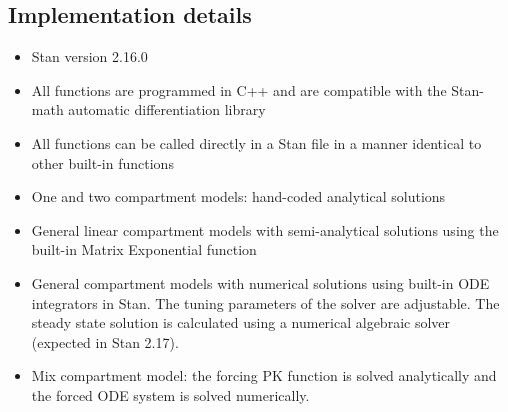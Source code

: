 \documentclass[11pt]{amsart}
\begin{document}
\subsection{Implementation details}
\begin{itemize}
  \item Stan version 2.16.0
  \item All functions are programmed in C++ and are compatible with the Stan-math automatic differentiation library \cite{AD}
  \item All functions can be called directly in a Stan file in a manner identical to other built-in functions
  \item One and two compartment models: hand-coded analytical solutions
  \item General linear compartment models with semi-analytical solutions using the built-in Matrix Exponential function
  \item General compartment models with numerical solutions using built-in ODE integrators in Stan. The tuning parameters of the solver are adjustable. The steady state solution is calculated using a numerical algebraic solver (expected in Stan 2.17).
  \item Mix compartment model: the forcing PK function is solved analytically and the forced ODE system is solved numerically.
\end{itemize}
\end{document}
